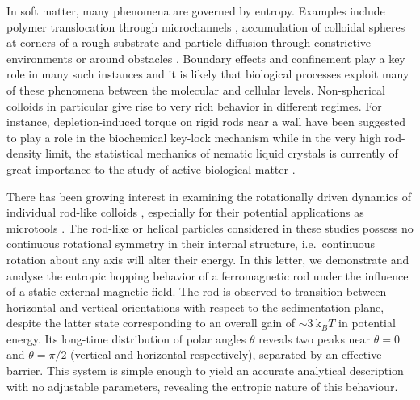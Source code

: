 \documentclass[aps,prl,reprint,twocolumn,superscriptaddress,showpacs]{revtex4-1}
\newcommand{\kk}{\mathrm{k}_B}
\begin{document}
%
%
%
%
%
%
%
In soft matter, many phenomena are governed by entropy. Examples include polymer translocation through microchannels \cite{Muthukumar1989,Ledesma-Aguilar2012}, accumulation of colloidal spheres at corners of a rough substrate \cite{Dinsmore1996} and particle diffusion through constrictive environments or around obstacles \cite{Chou1999,Zwanzig1992}. Boundary effects and confinement play a key role in many such instances and it is likely that biological processes exploit many of these phenomena between the molecular and cellular levels. Non-spherical colloids in particular give rise to very rich behavior in different regimes. For instance, depletion-induced torque on rigid rods near a wall have been suggested to play a role in the biochemical key-lock mechanism \cite{Roth2002,Helden2003} while in the very high rod-density limit, the statistical mechanics of nematic liquid crystals is currently of great importance to the study of active biological matter \cite{Baskaran2009,Marchetti2013}.

There has been growing interest in examining the rotationally driven dynamics of individual rod-like colloids \cite{Dhar2007,Shelton2005,Ghosh2012}, especially for their potential applications as microtools \cite{Solovev2012,Xi2013}. The rod-like or helical particles considered in these studies possess no continuous rotational symmetry in their internal structure, i.e.\ continuous rotation about any axis will alter their energy. In this letter, we demonstrate and analyse the entropic hopping behavior of a ferromagnetic rod under the influence of a static external magnetic field. The rod is observed to transition between horizontal and vertical orientations with respect to the sedimentation plane, despite the latter state corresponding to an overall gain of $\sim3\ \kk T$ in potential energy. Its long-time distribution of polar angles $\theta$ reveals two peaks near $\theta=0$ and $\theta=\pi/2$ (vertical and horizontal respectively), separated by an effective barrier. This system is simple enough to yield an accurate analytical description with no adjustable parameters, revealing the entropic nature of this behaviour. 
\end{document}
